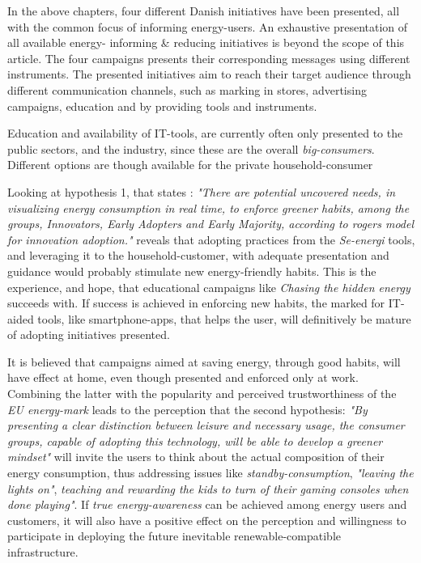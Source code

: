 \documentclass[journal]{IEEEtran}
\begin{document}
In the above chapters, four different Danish initiatives have been presented, all with the common focus of informing energy-users. An exhaustive presentation of all available energy- informing \& reducing initiatives is beyond the scope of this article. The four campaigns presents their corresponding messages using different instruments. The presented initiatives aim to reach their target audience through different communication channels, such as marking in stores, advertising campaigns, education and by providing tools and instruments.

Education and availability of IT-tools, are currently often only presented to the public sectors, and the industry, since these are the overall \textit{big-consumers}. Different options are though available for the private household-consumer 

Looking at hypothesis 1, that states :
\textit{"There are potential uncovered needs, in visualizing energy consumption in real time, to enforce greener habits, among the groups, Innovators, Early Adopters and Early Majority, according to rogers model for innovation adoption."}
reveals that adopting practices from the \textit{Se-energi} tools, and leveraging it to the household-customer, with adequate presentation and guidance would probably stimulate new energy-friendly habits. This is the experience, and hope, that educational campaigns like \textit{Chasing the hidden energy} succeeds with.
If success is achieved in enforcing new habits, the marked for IT-aided tools, like smartphone-apps, that helps the user, will definitively be mature of adopting initiatives presented.  

It is believed that campaigns aimed at saving energy, through good habits, will have effect at home, even though presented and enforced only at work. Combining the latter with the popularity and perceived trustworthiness of the \textit{EU energy-mark} leads to the perception that the second hypothesis: 
\textit{"By presenting a clear distinction between leisure and necessary usage, the consumer groups, capable of adopting this technology, will be able to develop a greener mindset"} will invite the users to think about the actual composition of their energy consumption, thus addressing issues like \textit{standby-consumption}, \textit{"leaving the lights on"}, \textit{teaching and rewarding the kids to turn of their gaming consoles when done playing"}. If \textit{true energy-awareness} can be achieved among energy users and customers, it will also have a positive effect on the perception and willingness to participate in deploying the future inevitable renewable-compatible infrastructure.   \newline
\end{document}
